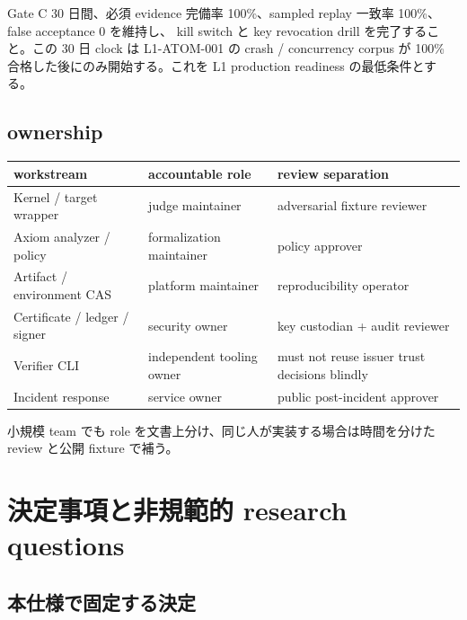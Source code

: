 \documentclass[a4paper,11pt]{ltjsarticle}
\begin{document}
\begin{decisionbox}{Gate C}
30 日間、必須 evidence 完備率 100\%、sampled replay 一致率 100\%、false acceptance 0 を維持し、
kill switch と key revocation drill を完了すること。この 30 日 clock は L1-ATOM-001 の crash / concurrency corpus が
100\% 合格した後にのみ開始する。これを L1 production readiness の最低条件とする。
\end{decisionbox}

\subsection{ownership}

\begin{tabularx}{\linewidth}{L{37mm}L{37mm}Y}
\toprule
\textbf{workstream} & \textbf{accountable role} & \textbf{review separation} \\
\midrule
Kernel / target wrapper & judge maintainer & adversarial fixture reviewer \\
Axiom analyzer / policy & formalization maintainer & policy approver \\
Artifact / environment CAS & platform maintainer & reproducibility operator \\
Certificate / ledger / signer & security owner & key custodian + audit reviewer \\
Verifier CLI & independent tooling owner & must not reuse issuer trust decisions blindly \\
Incident response & service owner & public post-incident approver \\
\bottomrule
\end{tabularx}

小規模 team でも role を文書上分け、同じ人が実装する場合は時間を分けた review と公開 fixture で補う。

\section{決定事項と非規範的 research questions}

\subsection{本仕様で固定する決定}
\end{document}
